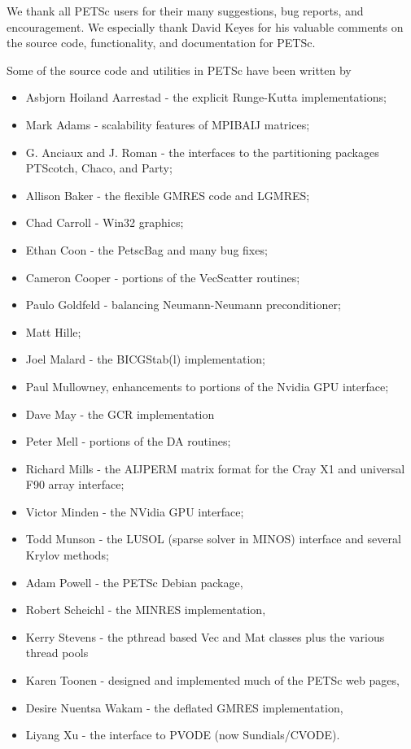%
%

\medskip \medskip \noindent
We thank all PETSc users for their many suggestions, bug reports, and
encouragement.  We especially thank David Keyes
for his valuable comments on the source code,
functionality, and documentation for PETSc.


\vspace{.3in}
\noindent
Some of the source code and utilities in PETSc
have been written by
\begin{itemize}
  \item Asbjorn Hoiland Aarrestad - the explicit Runge-Kutta implementations;
  \item Mark Adams - scalability features of MPIBAIJ matrices;
  \item G. Anciaux and J. Roman - the interfaces to the partitioning packages PTScotch, Chaco, and Party;
  \item Allison Baker - the flexible GMRES code and LGMRES;
  \item Chad Carroll - Win32 graphics;
  \item Ethan Coon - the PetscBag and many bug fixes;
  \item Cameron Cooper - portions of the VecScatter routines;
  \item Paulo Goldfeld - balancing Neumann-Neumann preconditioner;
  \item Matt Hille;
  \item Joel Malard - the BICGStab(l) implementation;
  \item Paul Mullowney, enhancements to portions of the Nvidia GPU interface;
  \item Dave May - the GCR implementation
  \item Peter Mell - portions of the DA routines;
  \item Richard Mills - the AIJPERM matrix format for the Cray X1 and universal F90 array interface;
  \item Victor Minden - the NVidia GPU interface;
  \item Todd Munson - the LUSOL (sparse solver in MINOS) interface and several Krylov methods;
  \item Adam Powell - the PETSc Debian package,
  \item Robert Scheichl - the MINRES implementation,
  \item Kerry Stevens - the pthread based Vec and Mat classes plus the various thread pools
  \item Karen Toonen - designed and implemented much of the PETSc web pages,
  \item Desire Nuentsa Wakam - the deflated GMRES implementation,
  \item Liyang Xu - the interface to PVODE (now Sundials/CVODE).
\end{itemize}

